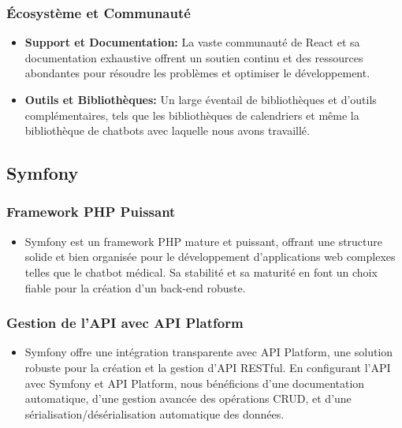 \subsubsection{Écosystème et Communauté}

\begin{itemize}
  \item \textbf{Support et Documentation: }La vaste communauté de React et sa documentation exhaustive offrent un soutien continu et des ressources abondantes pour résoudre les problèmes et optimiser le développement.
  \item \textbf{Outils et Bibliothèques: }Un large éventail de bibliothèques et d'outils complémentaires, tels que les bibliothèques de calendriers et même la bibliothèque de chatbots avec laquelle nous avons travaillé.
\end{itemize}


\subsection{Symfony}


\subsubsection{Framework PHP Puissant}

\begin{itemize}
  \item Symfony est un framework PHP mature et puissant, offrant une structure solide et bien organisée pour le développement d'applications web complexes telles que le chatbot médical. Sa stabilité et sa maturité en font un choix fiable pour la création d'un back-end robuste.
\end{itemize}

\subsubsection{Gestion de l'API avec API Platform}

\begin{itemize}
  \item Symfony offre une intégration transparente avec API Platform, une solution robuste pour la création et la gestion d'API RESTful. En configurant l'API avec Symfony et API Platform, nous bénéficions d'une documentation automatique, d'une gestion avancée des opérations CRUD, et d'une sérialisation/désérialisation automatique des données.
\end{itemize}

